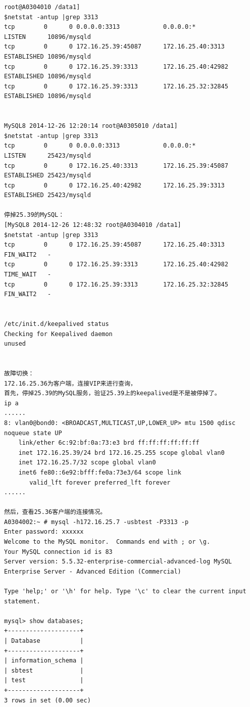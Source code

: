 \begin{verbatim}
root@A0304010 /data1]
$netstat -antup |grep 3313
tcp        0      0 0.0.0.0:3313            0.0.0.0:*               LISTEN      10896/mysqld        
tcp        0      0 172.16.25.39:45087      172.16.25.40:3313       ESTABLISHED 10896/mysqld        
tcp        0      0 172.16.25.39:3313       172.16.25.40:42982      ESTABLISHED 10896/mysqld        
tcp        0      0 172.16.25.39:3313       172.16.25.32:32845      ESTABLISHED 10896/mysqld        


MySQL8 2014-12-26 12:20:14 root@A0305010 /data1]
$netstat -antup |grep 3313
tcp        0      0 0.0.0.0:3313            0.0.0.0:*               LISTEN      25423/mysqld        
tcp        0      0 172.16.25.40:3313       172.16.25.39:45087      ESTABLISHED 25423/mysqld        
tcp        0      0 172.16.25.40:42982      172.16.25.39:3313       ESTABLISHED 25423/mysqld   

停掉25.39的MySQL：     
[MySQL8 2014-12-26 12:48:32 root@A0304010 /data1]
$netstat -antup |grep 3313
tcp        0      0 172.16.25.39:45087      172.16.25.40:3313       FIN_WAIT2   -                   
tcp        0      0 172.16.25.39:3313       172.16.25.40:42982      TIME_WAIT   -                   
tcp        0      0 172.16.25.39:3313       172.16.25.32:32845      FIN_WAIT2   -     

              
/etc/init.d/keepalived status
Checking for Keepalived daemon                                   unused


故障切换：
172.16.25.36为客户端，连接VIP来进行查询，
首先，停掉25.39的MySQL服务，验证25.39上的keepalived是不是被停掉了。
ip a
......
8: vlan0@bond0: <BROADCAST,MULTICAST,UP,LOWER_UP> mtu 1500 qdisc noqueue state UP 
    link/ether 6c:92:bf:0a:73:e3 brd ff:ff:ff:ff:ff:ff
    inet 172.16.25.39/24 brd 172.16.25.255 scope global vlan0
    inet 172.16.25.7/32 scope global vlan0
    inet6 fe80::6e92:bfff:fe0a:73e3/64 scope link 
       valid_lft forever preferred_lft forever
......

然后，查看25.36客户端的连接情况。
A0304002:~ # mysql -h172.16.25.7 -usbtest -P3313 -p
Enter password: xxxxxx
Welcome to the MySQL monitor.  Commands end with ; or \g.
Your MySQL connection id is 83
Server version: 5.5.32-enterprise-commercial-advanced-log MySQL Enterprise Server - Advanced Edition (Commercial)

Type 'help;' or '\h' for help. Type '\c' to clear the current input statement.

mysql> show databases;
+--------------------+
| Database           |
+--------------------+
| information_schema | 
| sbtest             | 
| test               | 
+--------------------+
3 rows in set (0.00 sec)


\end{verbatim}
